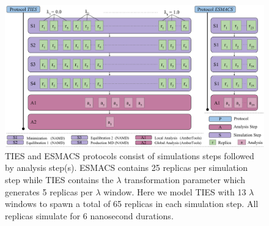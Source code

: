\begin{figure}
  \centering
  \includegraphics[width=\columnwidth]{figures/ties_esmacs_application_model.pdf}
  \caption{TIES and ESMACS protocols consist of simulations steps followed
  by analysis step(s). ESMACS contains 25 replicas per simulation step while 
  TIES contains the $\lambda$ transformation parameter which generates 5 
  replicas per $\lambda$ window. Here we model TIES with 13 $\lambda$ windows to 
  spawn a total of 65 replicas in each simulation step. All replicas simulate 
  for 6 nanosecond durations.}
\label{fig:ties_esmacs_application}
\end{figure}









